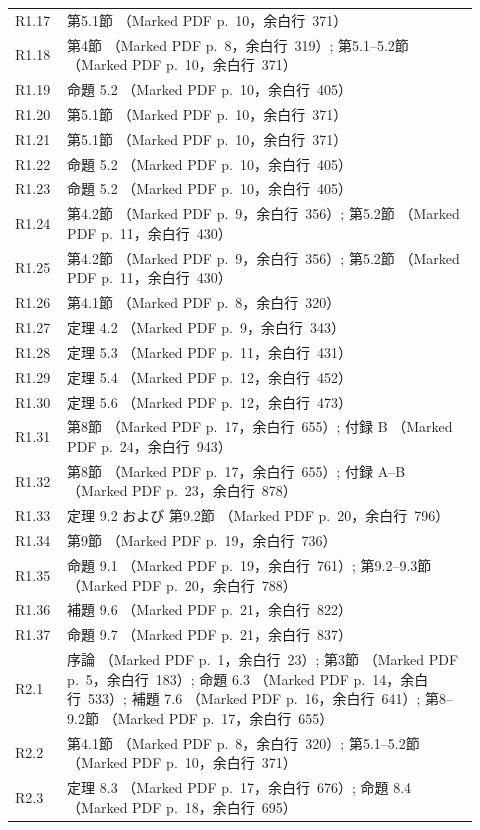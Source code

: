 \begin{longtable}{@{}p{0.09\linewidth}p{0.83\linewidth}@{}}
R1.17 & 第5.1節 （Marked PDF p.~10，余白行~371）\\
R1.18 & 第4節 （Marked PDF p.~8，余白行~319）; 第5.1--5.2節 （Marked PDF p.~10，余白行~371）\\
R1.19 & 命題 5.2 （Marked PDF p.~10，余白行~405）\\
R1.20 & 第5.1節 （Marked PDF p.~10，余白行~371）\\
R1.21 & 第5.1節 （Marked PDF p.~10，余白行~371）\\
R1.22 & 命題 5.2 （Marked PDF p.~10，余白行~405）\\
R1.23 & 命題 5.2 （Marked PDF p.~10，余白行~405）\\
R1.24 & 第4.2節 （Marked PDF p.~9，余白行~356）; 第5.2節 （Marked PDF p.~11，余白行~430）\\
R1.25 & 第4.2節 （Marked PDF p.~9，余白行~356）; 第5.2節 （Marked PDF p.~11，余白行~430）\\
R1.26 & 第4.1節 （Marked PDF p.~8，余白行~320）\\
R1.27 & 定理 4.2 （Marked PDF p.~9，余白行~343）\\
R1.28 & 定理 5.3 （Marked PDF p.~11，余白行~431）\\
R1.29 & 定理 5.4 （Marked PDF p.~12，余白行~452）\\
R1.30 & 定理 5.6 （Marked PDF p.~12，余白行~473）\\
R1.31 & 第8節 （Marked PDF p.~17，余白行~655）; 付録 B （Marked PDF p.~24，余白行~943）\\
R1.32 & 第8節 （Marked PDF p.~17，余白行~655）; 付録 A--B （Marked PDF p.~23，余白行~878）\\
R1.33 & 定理 9.2 および 第9.2節 （Marked PDF p.~20，余白行~796）\\
R1.34 & 第9節 （Marked PDF p.~19，余白行~736）\\
R1.35 & 命題 9.1 （Marked PDF p.~19，余白行~761）; 第9.2--9.3節 （Marked PDF p.~20，余白行~788）\\
R1.36 & 補題 9.6 （Marked PDF p.~21，余白行~822）\\
R1.37 & 命題 9.7 （Marked PDF p.~21，余白行~837）\\
R2.1 & 序論 （Marked PDF p.~1，余白行~23）; 第3節 （Marked PDF p.~5，余白行~183）; 命題 6.3 （Marked PDF p.~14，余白行~533）; 補題 7.6 （Marked PDF p.~16，余白行~641）; 第8--9.2節 （Marked PDF p.~17，余白行~655）\\
R2.2 & 第4.1節 （Marked PDF p.~8，余白行~320）; 第5.1--5.2節 （Marked PDF p.~10，余白行~371）\\
R2.3 & 定理 8.3 （Marked PDF p.~17，余白行~676）; 命題 8.4 （Marked PDF p.~18，余白行~695）\\

\end{longtable}
